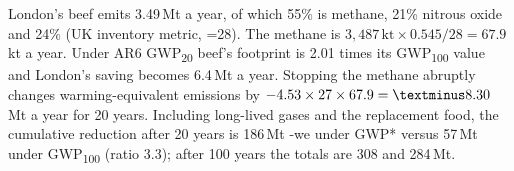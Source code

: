 London's beef emits 3.49\,Mt \COtwoe{} a year, of which 55\% is methane, 21\% nitrous oxide and 24\% \COtwo{} (UK inventory metric, \CHfour{}=28). The methane is $3{,}487\,\mathrm{kt}\times0.545/28 = 67.9$\,kt \CHfour{} a year. Under AR6 GWP\textsubscript{20} beef's footprint is 2.01 times its GWP\textsubscript{100} value and London's saving becomes 6.4\,Mt a year. Stopping the methane abruptly changes warming-equivalent emissions by $-4.53\times27\times67.9 = \textminus 8.30$\,Mt a year for 20 years. Including long-lived gases and the replacement food, the cumulative reduction after 20 years is 186\,Mt \COtwo-we under GWP* versus 57\,Mt under GWP\textsubscript{100} (ratio 3.3); after 100 years the totals are 308 and 284\,Mt.
